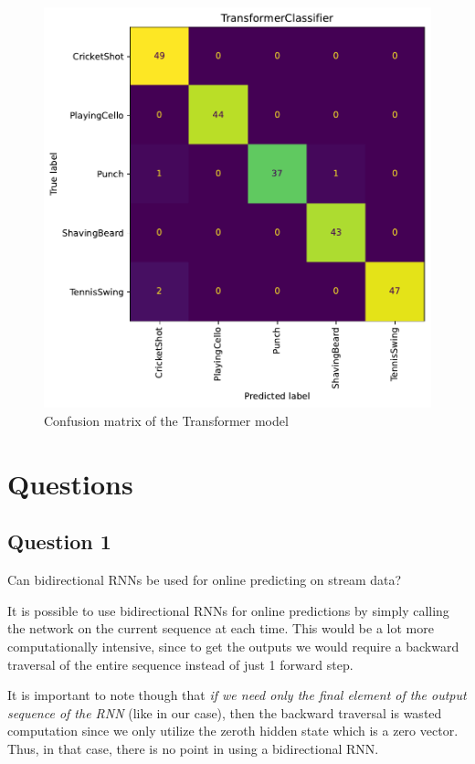 \documentclass{article}
\begin{document}
\begin{figure}[h]
    \label{fig:confmat_transformer}
    \centering
    \includegraphics[scale=0.5]{./transformer/confusion_matrix.pdf}
    \caption{Confusion matrix of the Transformer model}
\end{figure}

\section{Questions}

\subsection{Question 1}
\begin{tcolorbox}
    Can bidirectional RNNs be used for online predicting on stream data?
\end{tcolorbox}

It is possible to use bidirectional RNNs for online predictions by simply calling the network on the current sequence at each time. This would be a lot more computationally intensive, since to get the outputs we would require a backward traversal of the entire sequence instead of just 1 forward step.

It is important to note though that \emph{if we need only the final element of the output sequence of the RNN} (like in our case), then the backward traversal is wasted computation since we only utilize the zeroth hidden state which is a zero vector. Thus, in that case, there is no point in using a bidirectional RNN.
\end{document}
